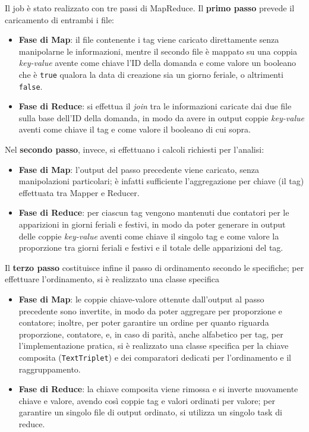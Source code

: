   Il job è stato realizzato con tre passi di MapReduce.
  Il \textbf{primo passo} prevede il caricamento di entrambi i file:
  \begin{itemize}
    \item
      \textbf{Fase di Map}:
      il file contenente i tag viene caricato direttamente senza manipolarne le informazioni,
      mentre il secondo file è mappato su una coppia \textit{key-value} avente come chiave l'ID della domanda
      e come valore un booleano che è \texttt{true} qualora la data di creazione sia un giorno feriale, o altrimenti \texttt{false}.

    \item
      \textbf{Fase di Reduce}:
      si effettua il \textit{join} tra le informazioni caricate dai due file sulla base dell'ID della domanda,
      in modo da avere in output coppie \textit{key-value} aventi come chiave il tag e come valore il booleano di cui sopra.
  \end{itemize}

  Nel \textbf{secondo passo}, invece, si effettuano i calcoli richiesti per l'analisi:
  \begin{itemize}
    \item
      \textbf{Fase di Map}:
      l'output del passo precedente viene caricato, senza manipolazioni particolari;
      è infatti sufficiente l'aggregazione per chiave (il tag) effettuata tra Mapper e Reducer.

    \item
      \textbf{Fase di Reduce}:
      per ciascun tag vengono mantenuti due contatori per le apparizioni in giorni feriali e festivi,
      in modo da poter generare in output delle coppie \textit{key-value} aventi come chiave il singolo tag e come valore la proporzione tra giorni feriali e festivi e il totale delle apparizioni del tag.
  \end{itemize}

  Il \textbf{terzo passo} costituisce infine il passo di ordinamento secondo le specifiche; per effettuare l'ordinamento, si è realizzato una classe specifica
  \begin{itemize}
    \item
      \textbf{Fase di Map}:
      le coppie chiave-valore ottenute dall'output al passo precedente sono invertite, in modo da poter aggregare per proporzione e contatore;
      inoltre, per poter garantire un ordine per quanto riguarda proporzione, contatore, e, in caso di parità, anche alfabetico per tag,
      per l'implementazione pratica, si è realizzato una classe specifica per la chiave composita (\texttt{TextTriplet}) e dei comparatori dedicati per l'ordinamento e il raggruppamento.

    \item
      \textbf{Fase di Reduce}:
      la chiave composita viene rimossa e si inverte nuovamente chiave e valore, avendo così coppie tag e valori ordinati per valore;
      per garantire un singolo file di output ordinato, si utilizza un singolo task di reduce.
  \end{itemize}

